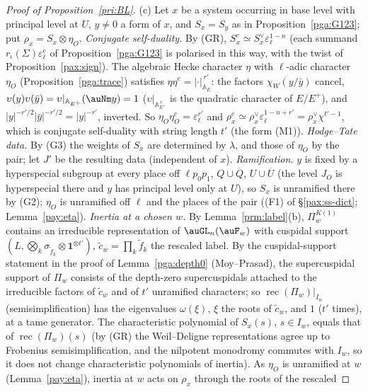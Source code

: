 \documentclass[10pt]{amsart}
\theoremstyle{definition}
\theoremstyle{remark}
\begin{document}
\begin{proof}[Proof of Proposition~\ref{pri:BL}]
(c) Let $x$ be a system occurring in base level with principal level at $U$, $y\ne0$ a form of $x$,
and $S_x=S_y$ as in Proposition~\ref{pga:G123}; put $\rho_x=S_x\otimes\eta_O$.
\emph{Conjugate self-duality.} By (GR), $S_x^c\simeq S_x^\vee\varepsilon_\ell^{1-n}$ (each summand
$r_\iota(\Sigma)\varepsilon_\ell^{e}$ of Proposition~\ref{pga:G123} is polarised in this way, with the
twist of Proposition~\ref{pax:sign}). The algebraic Hecke character
$\eta$ with $\ell$-adic character $\eta_O$ (Proposition~\ref{pga:trace}) satisfies $\eta\eta^c=
|\cdot|_{\mathbb A_E}^{\,r'}$: the factors $\chi_W(y/\bar y)$ cancel, $\upsilon(y)\upsilon(\bar y)=
\upsilon|_{\mathbb A_{E^+}}(\auNm y)=1$ ($\upsilon|_{\mathbb A_{E^+}^\times}$ is the quadratic character
of $E/E^+$), and $|y|^{-r'/2}|\bar y|^{-r'/2}=|y|^{-r'}$, inverted. So $\eta_O\eta_O^c=
\varepsilon_\ell^{r'}$ and $\rho_x^c\simeq\rho_x^\vee\varepsilon_\ell^{1-n+r'}=\rho_x^\vee\chi^{t'-1}$,
which is conjugate self-duality with string length $t'$ (the form (M1)).
\emph{Hodge--Tate data.} By (G3) the weights of $S_x$ are determined by $\lambda$, and those of
$\eta_O$ by the pair; let $J'$ be the resulting data (independent of $x$).
\emph{Ramification.} $y$ is fixed by a hyperspecial subgroup at every place off $\ell p_0p_1$,
$Q\cup\overline Q$, $U\cup\overline U$ (the level $J_O$ is hyperspecial there and $y$ has principal
level only at $U$), so $S_x$ is unramified there by (G2); $\eta_O$ is unramified off $\ell$ and the
places of the pair ((F1) of \S\ref{pax:ss-dict}; Lemma~\ref{pay:eta}).
\emph{Inertia at a chosen $w$.} By Lemma~\ref{prm:label}(b), $\Pi_w^{K(1)}$ contains an irreducible
representation of $\auGL_n(\auF_w)$ with cuspidal support $(L,\bigotimes_k\sigma_{\tilde f_k}\otimes
\mathbf 1^{\otimes t'})$, $\tilde c_w=\prod_k\tilde f_k$ the rescaled label. By the cuspidal-support
statement in the proof of
Lemma~\ref{pga:depth0} (Moy--Prasad), the supercuspidal support of $\Pi_w$ consists of the depth-zero
supercuspidals attached to the irreducible factors of $\tilde c_w$ and of $t'$ unramified characters;
so $\operatorname{rec}(\Pi_w)|_{I_w}$ (semisimplification) has the eigenvalues $\omega(\xi)$, $\xi$ the
roots of $\tilde c_w$, and $1$ ($t'$ times), at a tame generator. The characteristic polynomial of
$S_x(s)$, $s\in I_w$, equals that of $\operatorname{rec}(\Pi_w)(s)$ (by (GR) the Weil--Deligne
representations agree up to Frobenius semisimplification, and the nilpotent monodromy commutes with
$I_w$, so it does not change characteristic polynomials of inertia). As $\eta_O$ is unramified at $w$ (Lemma~\ref{pay:eta}), inertia at $w$ acts on $\rho_x$ through the roots of the rescaled

\end{proof}
\end{document}
